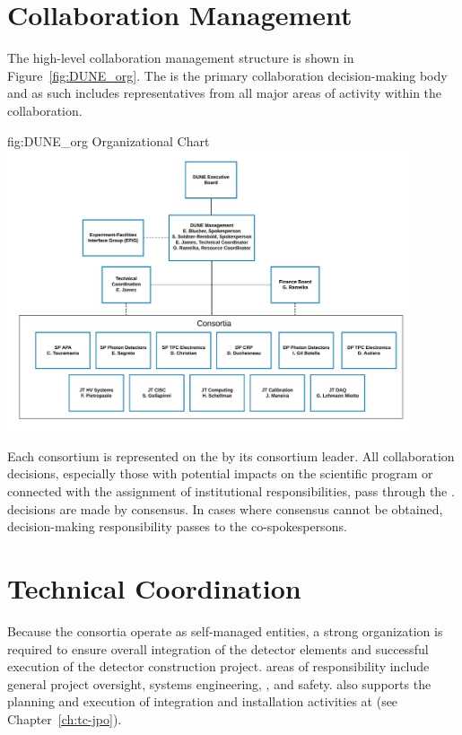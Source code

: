 \section{ Collaboration Management}
\label{sec:dune_mgmt}

The high-level  collaboration management structure is 
shown in Figure~\ref{fig:DUNE_org}.  The   is 
the primary collaboration decision-making body and as such includes 
representatives from all major areas of activity within the 
collaboration.
\begin{dunefigure}{fig:DUNE_org}
  { Organizational Chart}
  \includegraphics[width=0.9\textwidth]{graphics/DUNE_Mgmt_20191001_v2}
\end{dunefigure}

Each consortium is represented on the   by its 
consortium leader.  All collaboration decisions, especially those with 
potential impacts on the  scientific program or connected 
with the assignment of institutional responsibilities, pass through the 
.   decisions are made by  %
consensus.  In cases where consensus cannot be obtained, decision-making 
responsibility passes to the co-spokespersons.

\section{Technical Coordination}
\label{sec:tc}

Because the consortia operate as self-managed entities, a strong
 organization is required to ensure overall integration 
of the detector elements and successful execution of the detector
construction project.   areas of responsibility include 
general project oversight, systems engineering, , and 
safety.   also supports the planning and execution 
of integration and installation activities at  (see 
Chapter~\ref{ch:tc-jpo}).  


